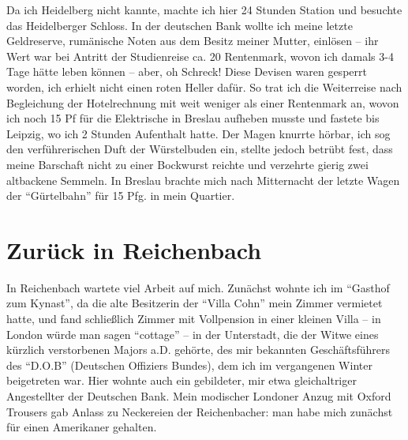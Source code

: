 Da ich Heidelberg nicht kannte, machte ich hier 24 Stunden Station und besuchte das Heidelberger Schloss. In der deutschen Bank wollte ich meine letzte Geldreserve, rumänische Noten aus dem Besitz meiner Mutter, einlösen -- ihr Wert war bei Antritt der Studienreise ca. 20 Rentenmark, wovon ich damals 3-4 Tage hätte leben können -- aber, oh Schreck! Diese Devisen waren gesperrt worden, ich erhielt nicht einen roten Heller dafür. So trat ich die Weiterreise nach Begleichung der Hotelrechnung mit weit weniger als einer Rentenmark an, wovon ich noch 15 Pf für die Elektrische in Breslau aufheben musste und fastete bis Leipzig, wo ich 2 Stunden Aufenthalt hatte. Der Magen knurrte hörbar, ich sog den verführerischen Duft der Würstelbuden ein, stellte jedoch betrübt fest, dass meine Barschaft nicht zu einer Bockwurst reichte und verzehrte gierig zwei altbackene Semmeln. In Breslau brachte mich nach Mitternacht der letzte Wagen der \enquote{Gürtelbahn} für 15 Pfg. in mein Quartier.

\section{Zurück in Reichenbach}
In Reichenbach wartete viel Arbeit auf mich. Zunächst wohnte ich im \enquote{Gasthof zum Kynast}, da die alte Besitzerin der \enquote{Villa Cohn} mein Zimmer vermietet hatte, und fand schließlich Zimmer mit Vollpension in einer kleinen Villa -- in London würde man sagen \enquote{cottage} -- in der Unterstadt, die der Witwe eines kürzlich verstorbenen Majors a.D. gehörte, des mir bekannten Geschäftsführers des \enquote{D.O.B} (Deutschen Offiziers Bundes), dem ich im vergangenen Winter beigetreten war. Hier wohnte auch ein gebildeter, mir etwa gleichaltriger Angestellter der Deutschen Bank. Mein modischer Londoner Anzug mit Oxford Trousers gab Anlass zu Neckereien der Reichenbacher: man habe mich zunächst für einen Amerikaner gehalten.


